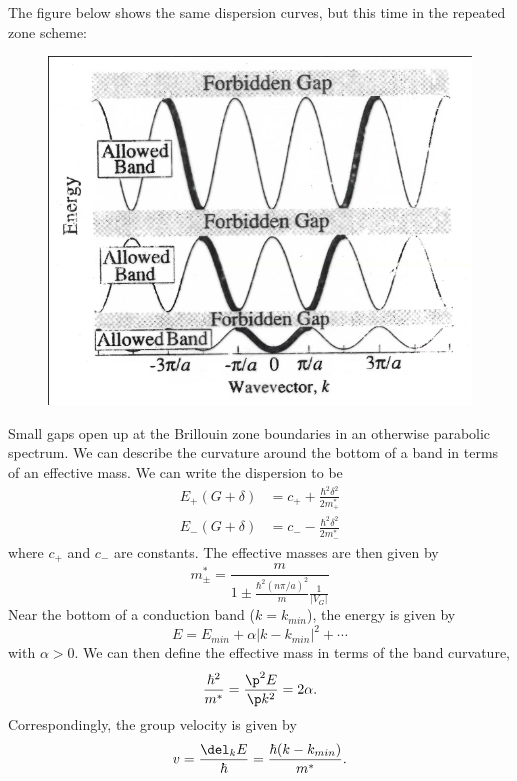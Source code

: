 \documentclass[a4paper, 11pt, normalem]{report}
\begin{document}
The figure below shows the same dispersion curves, but this time in the repeated zone scheme:
\begin{figure}[H]
    \centering
    \includegraphics[scale=0.5]{rep.png}
\end{figure}
Small gaps open up at the Brillouin zone boundaries in an otherwise parabolic spectrum.
We can describe the curvature around the bottom of a band in terms of an effective mass.
We can write the dispersion to be
\begin{align}
    E_+(G+\delta) &= c_+ + \frac{\hbar^2\delta^2}{2m_+^*} \\
    E_-(G+\delta) &= c_- - \frac{\hbar^2\delta^2}{2m_-^*}
\end{align}
where $c_+$ and $c_-$ are constants.
The effective masses are then given by
\begin{equation}
    m_{\pm}^* = \frac{m}{1 \pm \frac{\hbar^2(n\pi/a)^2}{m}\frac{1}{|V_G|}}
\end{equation}
Near the bottom of a conduction band ($k = k_{min}$), the energy is given by
\begin{equation}
    E = E_{min} + \alpha|k-k_{min}|^2 + \cdots
\end{equation}
with $\alpha > 0$.
We can then define the effective mass in terms of the band curvature,
\begin{equation}
    \frac{\hbar^2}{m^*} = \frac{\p^2E}{\p k^2} = 2\alpha.
\end{equation}
Correspondingly, the group velocity is given by
\begin{equation}
    v = \frac{\del_k E}{\hbar} = \frac{\hbar(k-k_{min})}{m^*}.
\end{equation}
\end{document}
